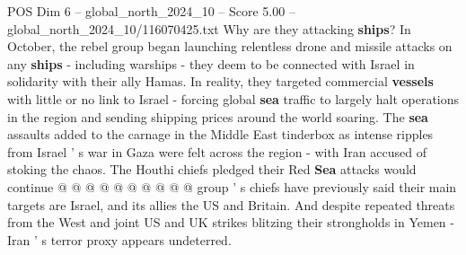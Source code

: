 \begin{textsample}{POS Dim 6 – global\_north\_2024\_10 – Score 5.00 – global\_north\_2024\_10/116070425.txt}
Why are they attacking \textbf{ships}?
In October, the rebel group began launching relentless drone and missile attacks on any \textbf{ships} - including warships - they deem to be connected with Israel in solidarity with their ally Hamas.
In reality, they targeted commercial \textbf{vessels} with little or no link to Israel - forcing global \textbf{sea} traffic to largely halt operations in the region and sending shipping prices around the world soaring.
The \textbf{sea} assaults added to the carnage in the Middle East tinderbox as intense ripples from Israel ' s war in Gaza were felt across the region - with Iran accused of stoking the chaos.
The Houthi chiefs pledged their Red \textbf{Sea} attacks would continue @ @ @ @ @ @ @ @ @ @ group ' s chiefs have previously said their main targets are Israel, and its allies the US and Britain.
And despite repeated threats from the West and joint US and UK strikes blitzing their strongholds in Yemen - Iran ' s terror proxy appears undeterred.

\end{textsample}
